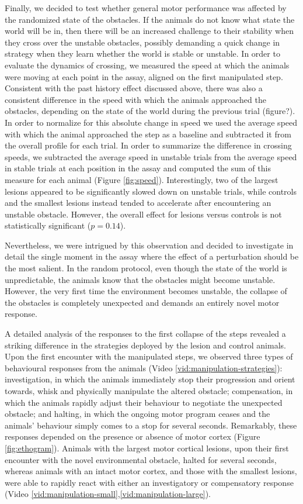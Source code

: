 Finally, we decided to test whether general motor performance was affected by the randomized state of the obstacles. If the animals do not know what state the world will be in, then there will be an increased challenge to their stability when they cross over the unstable obstacles, possibly demanding a quick change in strategy when they learn whether the world is stable or unstable. In order to evaluate the dynamics of crossing, we measured the speed at which the animals were moving at each point in the assay, aligned on the first manipulated step. Consistent with the past history effect discussed above, there was also a consistent difference in the speed with which the animals approached the obstacles, depending on the state of the world during the previous trial (figure?). In order to normalize for this absolute change in speed we used the average speed with which the animal approached the step as a baseline and subtracted it from the overall profile for each trial. In order to summarize the difference in crossing speeds, we subtracted the average speed in unstable trials from the average speed in stable trials at each position in the assay and computed the sum of this measure for each animal (Figure \ref{fig:speed}). Interestingly, two of the largest lesions appeared to be significantly slowed down on unstable trials, while controls and the smallest lesions instead tended to accelerate after encountering an unstable obstacle. However, the overall effect for lesions versus controls is not statistically significant ($p = 0.14$).

Nevertheless, we were intrigued by this observation and decided to investigate in detail the single moment in the assay where the effect of a perturbation should be the most salient. In the random protocol, even though the state of the world is unpredictable, the animals know that the obstacles might become unstable. However, the very first time the environment becomes unstable, the collapse of the obstacles is completely unexpected and demands an entirely novel motor response.

A detailed analysis of the responses to the first collapse of the steps revealed a striking difference in the strategies deployed by the lesion and control animals. Upon the first encounter with the manipulated steps, we observed three types of behavioural responses from the animals (Video \ref{vid:manipulation-strategies}): investigation, in which the animals immediately stop their progression and orient towards, whisk and physically manipulate the altered obstacle; compensation, in which the animals rapidly adjust their behaviour to negotiate the unexpected obstacle; and halting, in which the ongoing motor program ceases and the animals' behaviour simply comes to a stop for several seconds. Remarkably, these responses depended on the presence or absence of motor cortex (Figure \ref{fig:ethogram}). Animals with the largest motor cortical lesions, upon their first encounter with the novel environmental obstacle, halted for several seconds, whereas animals with an intact motor cortex, and those with the smallest lesions, were able to rapidly react with either an investigatory or compensatory response (Video \ref{vid:manipulation-small},\ref{vid:manipulation-large}).

